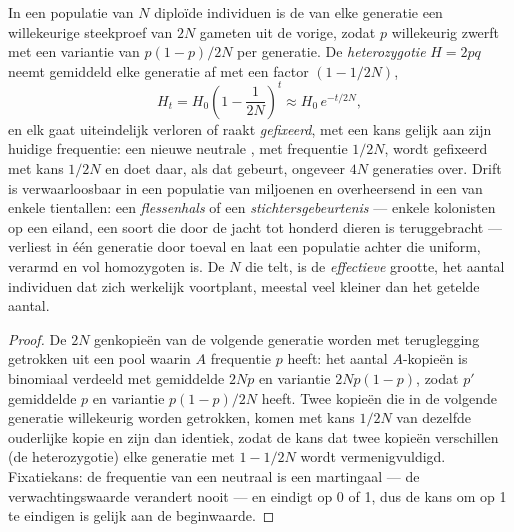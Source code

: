 \begin{theorem}\label{thm:b2:population-genetics:drift}
In een populatie van $N$ diploïde individuen is de  van elke
generatie een willekeurige steekproef van $2N$ gameten uit de vorige, zodat
$p$ willekeurig zwerft met een variantie van
$p(1 - p)/2N$ per generatie. De \emph{heterozygotie} $H = 2pq$
neemt gemiddeld elke generatie af met een factor $(1 - 1/2N)$,
\[
H_t = H_0\left(1 - \frac{1}{2N}\right)^{t} \approx H_0\,e^{-t/2N},
\]
en elk  gaat uiteindelijk verloren of raakt \emph{gefixeerd}, met een
kans gelijk aan zijn huidige frequentie: een nieuwe neutrale ,
met frequentie $1/2N$, wordt gefixeerd met kans $1/2N$ en doet daar, als
dat gebeurt, ongeveer $4N$ generaties over. Drift is verwaarloosbaar in een
populatie van miljoenen en overheersend in een van enkele tientallen: een
\emph{flessenhals} of een \emph{stichtersgebeurtenis} --- enkele kolonisten op
een eiland, een soort die door de jacht tot honderd dieren is teruggebracht
--- verliest in één generatie  door toeval en laat een populatie achter
die uniform, verarmd en vol homozygoten is. De $N$ die telt, is de
\emph{effectieve} grootte, het aantal individuen dat zich werkelijk
voortplant, meestal veel kleiner dan het getelde aantal.
\end{theorem}
\begin{proof}
De $2N$ genkopieën van de volgende generatie worden met teruglegging getrokken
uit een pool waarin $A$ frequentie $p$ heeft: het aantal $A$-kopieën
is binomiaal verdeeld met gemiddelde $2Np$ en variantie $2Np(1 - p)$, zodat $p'$
gemiddelde $p$ en variantie $p(1 - p)/2N$ heeft. Twee kopieën die in de
volgende generatie willekeurig worden getrokken, komen met kans $1/2N$ van
dezelfde ouderlijke kopie en zijn dan identiek, zodat de kans dat twee
kopieën verschillen (de heterozygotie) elke generatie met $1 - 1/2N$ wordt
vermenigvuldigd. Fixatiekans: de frequentie van een neutraal  is een
martingaal --- de verwachtingswaarde verandert nooit --- en eindigt op 0
of 1, dus de kans om op 1 te eindigen is gelijk aan de beginwaarde.
\end{proof}

